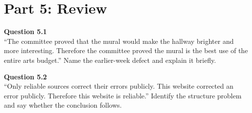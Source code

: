 \documentclass[12pt]{article}
\begin{document}

\newpage

\section*{Part 5: Review}

\textbf{Question 5.1}\\[-0.15em]
``The committee proved that the mural would make the hallway brighter and more interesting. Therefore the committee proved the mural is the best use of the entire arts budget.'' Name the earlier-week defect and explain it briefly.


\textbf{Question 5.2}\\[-0.15em]
``Only reliable sources correct their errors publicly. This website corrected an error publicly. Therefore this website is reliable.'' Identify the structure problem and say whether the conclusion follows.

\end{document}
